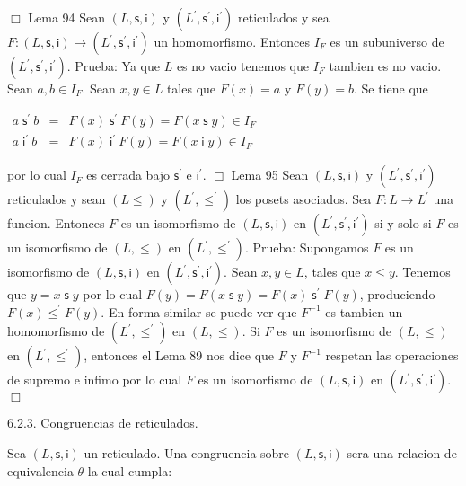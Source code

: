 \(\Box\)
Lema 94 Sean \((L,\mathsf{s},\mathsf{i})\) y \((L^{\prime },\mathsf{s}^{\prime }, \mathsf{i}^{\prime })\) reticulados y sea \(F:(L,\mathsf{s},\mathsf{i} )\rightarrow (L^{\prime },\mathsf{s}^{\prime },\mathsf{i}^{\prime })\) un homomorfismo. Entonces \(I_{F}\) es un subuniverso de \((L^{\prime },\mathsf{s} ^{\prime },\mathsf{i}^{\prime })\).
Prueba: Ya que \(L\) es no vacio tenemos que \(I_{F}\) tambien es no vacio. Sean \(a,b\in I_{F}\). Sean \(x,y\in L\) tales que \(F(x)=a\) y \(F(y)=b\). Se tiene que

\(\displaystyle \begin{array}{rcl} a\;\mathsf{s}^{\prime }\ b & =& F(x)\;\mathsf{s}^{\prime }\ F(y)=F(x\mathsf{ \;s\;}y)\in I_{F} \\ a\;\mathsf{i}^{\prime }\ b & =& F(x)\;\mathsf{i}^{\prime }\ F(y)=F(x\mathsf{ \;i\;}y)\in I_{F} \end{array} \)

por lo cual \(I_{F}\) es cerrada bajo \(\mathsf{s}^{\prime }\) e \(\mathsf{i} ^{\prime }\). \(\Box\)
Lema 95 Sean \((L,\mathsf{s},\mathsf{i})\) y \((L^{\prime },\mathsf{s}^{\prime }, \mathsf{i}^{\prime })\) reticulados y sean \((L\leq )\) y \((L^{\prime },\leq ^{\prime })\) los posets asociados. Sea \(F:L\rightarrow L^{\prime }\) una funcion. Entonces \(F\) es un isomorfismo de \((L,\mathsf{s},\mathsf{i})\) en \( (L^{\prime },\mathsf{s}^{\prime },\mathsf{i}^{\prime })\) si y solo si \(F\) es un isomorfismo de \((L,\leq )\) en \((L^{\prime },\leq ^{\prime })\).
Prueba: Supongamos \(F\) es un isomorfismo de \((L,\mathsf{s},\mathsf{i})\) en \( (L^{\prime },\mathsf{s}^{\prime },\mathsf{i}^{\prime })\). Sean \(x,y\in L\), tales que \(x\leq y\). Tenemos que \(y=x\mathsf{\;s\;}y\) por lo cual \(F(y)=F(x \mathsf{\;s\;}y)=F(x)\mathsf{\;s^{\prime }\;}F(y)\), produciendo \(F(x)\leq ^{\prime }F(y)\). En forma similar se puede ver que \(F^{-1}\) es tambien un homomorfismo de \((L^{\prime },\leq ^{\prime })\) en \((L,\leq )\). Si \(F\) es un isomorfismo de \((L,\leq )\) en \((L^{\prime },\leq ^{\prime })\), entonces el Lema 89 nos dice que \(F\) y \(F^{-1}\) respetan las operaciones de supremo e infimo por lo cual \(F\) es un isomorfismo de \((L,\mathsf{s},\mathsf{ i})\) en \((L^{\prime },\mathsf{s}^{\prime },\mathsf{i}^{\prime })\). \(\Box\)

6.2.3. Congruencias de reticulados.

Sea \((L,\mathsf{s},\mathsf{i})\) un reticulado. Una congruencia sobre \((L,\mathsf{s},\mathsf{i})\) sera una relacion de equivalencia \(\theta \) la cual cumpla:

